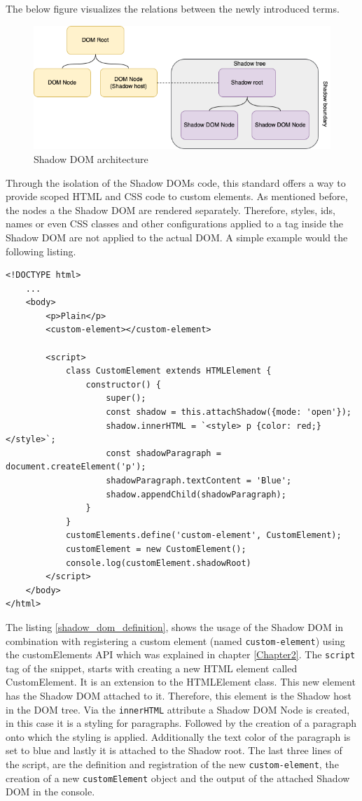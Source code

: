 The below figure visualizes the relations between the newly introduced terms.

\begin{figure}[!h]
	\centering
	\includegraphics[width=1\textwidth]{Figures/shadow_dom.drawio.png}
	\caption{Shadow DOM architecture}
	\label{fig:shadow_dom}
\end{figure}

Through the isolation of the Shadow DOMs code, this standard offers a way to provide scoped HTML and CSS code to custom elements. As mentioned before, the nodes a the Shadow DOM are rendered separately. Therefore, styles, ids, names or even CSS classes and other configurations applied to a tag inside the Shadow DOM are not applied to the actual DOM.
A simple example would the following listing.

\begin{lstlisting}[caption=Defenition of a custom element using the Shadow DOM \cite{simon_thesis}, label=shadow_dom_definition]
<!DOCTYPE html> 
	...
	<body>
		<p>Plain</p> 
		<custom-element></custom-element>
		
		<script>
			class CustomElement extends HTMLElement {
				constructor() { 
					super();
					const shadow = this.attachShadow({mode: 'open'}); 
					shadow.innerHTML = `<style> p {color: red;} </style>`; 
					const shadowParagraph = document.createElement('p'); 
					shadowParagraph.textContent = 'Blue'; 
					shadow.appendChild(shadowParagraph);
				}
			}
			customElements.define('custom-element', CustomElement); 
			customElement = new CustomElement(); 
			console.log(customElement.shadowRoot)
		</script>
	</body>
</html>
\end{lstlisting}

The listing \ref{shadow_dom_definition}, shows the usage of the Shadow DOM in combination with registering a custom element (named \texttt{custom-element}) using the customElements API which was explained in chapter \ref{Chapter2}.
The \texttt{script} tag of the snippet, starts with creating a new HTML element called CustomElement. It is an extension to the HTMLElement class. This new element has the Shadow DOM attached to it. Therefore, this element is the Shadow host in the DOM tree. Via the \texttt{innerHTML} attribute a Shadow DOM Node is created, in this case it is a styling for paragraphs. Followed by the creation of a paragraph onto which the styling is applied. Additionally the text color of the paragraph is set to blue and lastly it is attached to the Shadow root.
The last three lines of the script, are the definition and registration of the new \texttt{custom-element}, the creation of a new \texttt{customElement} object and the output of the attached Shadow DOM in the console.

